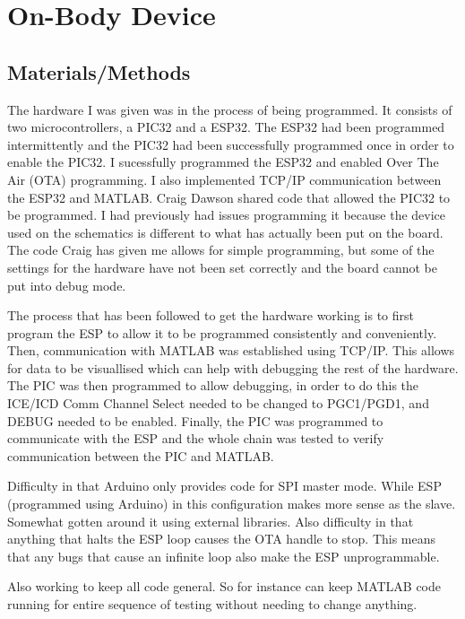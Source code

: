 \chapter{On-Body Device}

\section{Materials/Methods}
%

The hardware I was given was in the process of being programmed.
It consists of two microcontrollers, a PIC32 and a ESP32.
The ESP32 had been programmed intermittently
and the PIC32 had been successfully programmed once in order to enable the PIC32.
I sucessfully programmed the ESP32 and enabled Over The Air (OTA) programming.
I also implemented TCP/IP communication between the ESP32 and MATLAB.
Craig Dawson shared code that allowed the PIC32 to be programmed.
I had previously had issues programming it
because the device used on the schematics is different
to what has actually been put on the board.
The code Craig has given me allows for simple programming,
but some of the settings for the hardware have not been set correctly
and the board cannot be put into debug mode.

The process that has been followed to get the hardware working
is to first program the ESP to allow it to be programmed consistently and conveniently.
Then, communication with MATLAB was established using TCP/IP.
This allows for data to be visuallised
which can help with debugging the rest of the hardware.
The PIC was then programmed to allow debugging,
in order to do this the ICE/ICD Comm Channel Select needed to be changed to PGC1/PGD1,
and DEBUG needed to be enabled.
Finally, the PIC was programmed to communicate with the ESP
and the whole chain was tested to verify communication between the PIC and MATLAB.

Difficulty in that Arduino only provides code for SPI master mode.
While ESP (programmed using Arduino) in this configuration makes more sense as the slave.
Somewhat gotten around it using external libraries.
Also difficulty in that anything that halts the ESP loop causes the OTA handle to stop.
This means that any bugs that cause an infinite loop also make the ESP unprogrammable.

Also working to keep all code general.
So for instance can keep MATLAB code running
for entire sequence of testing without needing to change anything.

